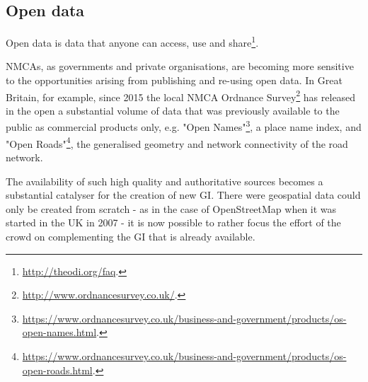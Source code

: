 \documentclass{llncs}
\begin{document}
\subsection{Open data}

Open data is data that anyone can access, use and share\footnote{\url{http://theodi.org/faq}.}. 

NMCAs, as governments and private organisations, are becoming more sensitive to the opportunities arising from publishing and re-using open data. In Great Britain, for example, since 2015 the local NMCA Ordnance Survey\footnote{\url{http://www.ordnancesurvey.co.uk/}.} has released in the open a substantial volume of data that was previously available to the public as commercial products only, e.g. "Open Names"\footnote{\url{https://www.ordnancesurvey.co.uk/business-and-government/products/os-open-names.html}.}, a place name index, and "Open Roads"\footnote{\url{https://www.ordnancesurvey.co.uk/business-and-government/products/os-open-roads.html}.}, the generalised geometry and network connectivity of the road network.

The availability of such high quality and authoritative sources becomes a substantial catalyser for the creation of new GI. There were geospatial data could only be created from scratch - as in the case of OpenStreetMap when it was started in the UK in 2007 - it is now possible to rather focus the effort of the crowd on complementing the GI that is already available.
\end{document}
